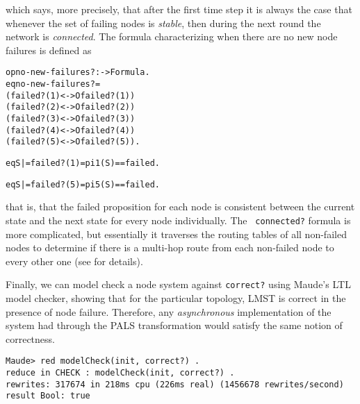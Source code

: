 \documentclass[copyright,creativecommons]{eptcs}
\begin{document}
\noindent
which says, more precisely, that after the first time step it is always the
case that whenever the set of failing nodes is \emph{stable}, then during the
next round the network is \emph{connected}. The formula characterizing when
there are no new node failures is defined as

\begin{center}
\begin{small}
\begin{boxedminipage}{0.50\textwidth}
\begin{alltt}
op no-new-failures? : -> Formula .
eq no-new-failures? = 
    (failed?(1) <-> O failed?(1)) 
    (failed?(2) <-> O failed?(2)) 
    (failed?(3) <-> O failed?(3)) 
    (failed?(4) <-> O failed?(4)) 
    (failed?(5) <-> O failed?(5)) .

eq S |= failed?(1) = pi1(S) == failed .

eq S |= failed?(5) = pi5(S) == failed .
\end{alltt}
\end{boxedminipage}
\end{small}
\end{center}

\noindent
that is, that the failed proposition for each node is consistent between the
current state and the next state for every node individually. The {\tt
connected?} formula is more complicated, but essentially it traverses the
routing tables of all non-failed nodes to determine if there is a multi-hop
route from each non-failed node to every other one (see \cite{katelman_2010_01}
for details).

Finally, we can model check a  node system against {\tt correct?} using
Maude's LTL model checker, showing that for the particular topology, LMST is
correct in the presence of node failure. Therefore, any \emph{asynchronous}
implementation of the system had through the PALS transformation would satisfy
the same notion of correctness.

\begin{center}
\begin{small}
\begin{boxedminipage}{0.85\textwidth}
\begin{verbatim}
Maude> red modelCheck(init, correct?) .
reduce in CHECK : modelCheck(init, correct?) .
rewrites: 317674 in 218ms cpu (226ms real) (1456678 rewrites/second)
result Bool: true
\end{verbatim}
\end{boxedminipage}
\end{small}
\end{center}
\end{document}
